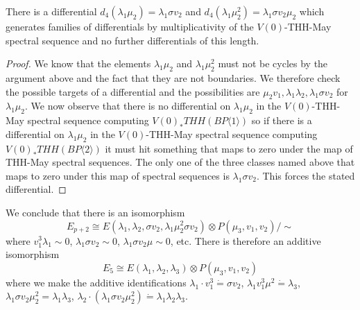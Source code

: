 \begin{lem}
There is a differential $d_{4}(\lambda_1\mu_2)=\lambda_1\sigma v_2$ and $d_{4}(\lambda_1 \mu_2^2)=\lambda_1\sigma v_2\mu_2$ which generates families of differentials by multiplicativity of the $V(0)$-THH-May spectral sequence and no further differentials of this length. 
\end{lem}
\begin{proof}
We know that the elements $\lambda_1\mu_2$ and $\lambda_1 \mu_2^2$ must not be cycles by the argument above and the fact that they are not boundaries. We therefore check the possible targets of a differential and the possibilities are $\mu_2v_1, \lambda_1\lambda_2, \lambda_1\sigma v_2$  for $\lambda_1\mu_2$. We now observe that there is no differential on $\lambda_1\mu_2$ in the $V(0)$-THH-May spectral sequence computing $V(0)_*THH(BP\langle 1\rangle )$ so if there is a differential on $\lambda_1\mu_2$ in the $V(0)$-THH-May spectral sequence computing $V(0)_*THH(BP\langle 2\rangle )$ it must hit something that maps to zero under the map of THH-May spectral sequences. The only one of the three classes named above that maps to zero under this map of spectral sequences is $\lambda_1\sigma v_2$. This forces the stated differential. 
\end{proof}
\begin{comment}
\gabe{Add similar argument for the other differential}
\dom{I think you can obtain a simpler proof by mapping to the $H\wedge V(0)$-based THH-May spectral sequence, wherein these differentials occur.}
\end{comment}
We conclude that there is an isomorphism 
\[E_{p+2} \cong  E(\lambda_1,\lambda_2,\sigma v_2, \lambda_1\mu_2^2\sigma v_2)\otimes P( \mu_3 ,v_1 ,v_2) / \sim \]
where $v_1^3\lambda_1 \sim 0$, $\lambda_1\sigma v_2\sim 0$, $\lambda_1\sigma v_2 \mu \sim 0$, etc. 
There is therefore an additive isomorphism 
\[ E_{5}\cong E(\lambda_1, \lambda_2, \lambda_3)\otimes P(\mu_3,v_1, v_2) \]
where we make the additive identifications $\lambda_1\cdot v_1^3\dot{=} \sigma v_2$, $\lambda_1v_1^3\mu^{2}\dot{=}\lambda_3$, $\lambda_1\sigma v_2\mu_2^{2}=\lambda_1\lambda_3$, $\lambda_2\cdot (\lambda_1\sigma v_2\mu_2^{2})\dot{=}\lambda_1\lambda_2\lambda_3$. 

